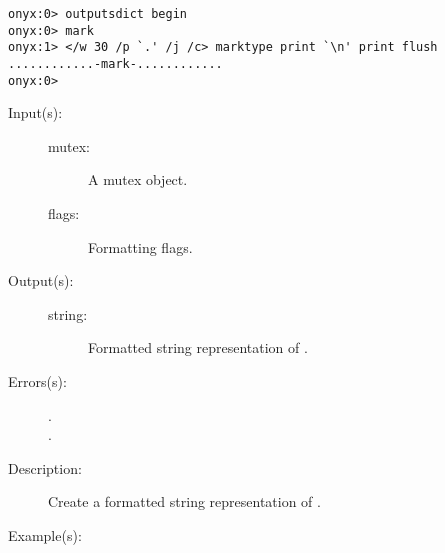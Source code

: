 \begin{description}
\begin{description}
\begin{verbatim}
onyx:0> outputsdict begin
onyx:0> mark
onyx:1> </w 30 /p `.' /j /c> marktype print `\n' print flush
............-mark-............
onyx:0>
		\end{verbatim}
	\end{description}
\label{outputsdict:mutextype}
\item[{\onyxop{mutex flags}{mutextype}{string}}: ]
	\begin{description}\item[]
	\item[Input(s): ]
		\begin{description}\item[]
		\item[mutex: ]
			A mutex object.
		\item[flags: ]
			Formatting flags.
		\end{description}
	\item[Output(s): ]
		\begin{description}\item[]
		\item[string: ]
			Formatted string representation of .
		\end{description}
	\item[Errors(s): ]
		\begin{description}\item[]
		\item[.]
		\item[.]
		\end{description}
	\item[Description: ]
		Create a formatted string representation of .
	\item[Example(s): ]\begin{verbatim}


\end{verbatim}
\end{description}
\end{description}
